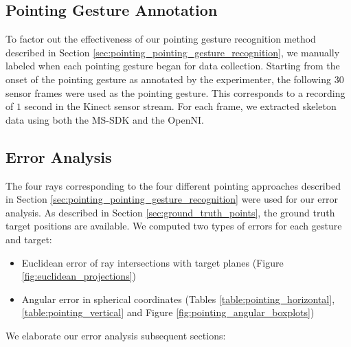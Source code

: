 \documentclass[12pt]{gatech-thesis}
\begin{document}
\subsection{Pointing Gesture Annotation}
\label{sec:pointing_gesture_annotation}

To factor out the effectiveness of our pointing gesture recognition method described in Section \ref{sec:pointing_pointing_gesture_recognition}, we manually labeled when each pointing gesture began for data collection. Starting from the onset of the pointing gesture as annotated by the experimenter, the following $30$ sensor frames were used as the pointing gesture. This corresponds to a recording of $1$ second in the Kinect sensor stream. For each frame, we extracted skeleton data using both the MS-SDK and the OpenNI.

\subsection{Error Analysis}
\label{sec:pointing_error_analysis}

The four rays corresponding to the four different pointing approaches described in Section \ref{sec:pointing_pointing_gesture_recognition} were used for our error analysis.  As described in Section \ref{sec:ground_truth_points}, the ground truth target positions are available. We computed two types of errors for each gesture and target:

\begin{itemize}
\item Euclidean error of ray intersections with target planes (Figure \ref{fig:euclidean_projections})
\item Angular error in spherical coordinates (Tables \ref{table:pointing_horizontal},\ref{table:pointing_vertical} and Figure \ref{fig:pointing_angular_boxplots})
\end{itemize}

We elaborate our error analysis subsequent sections:
\end{document}
